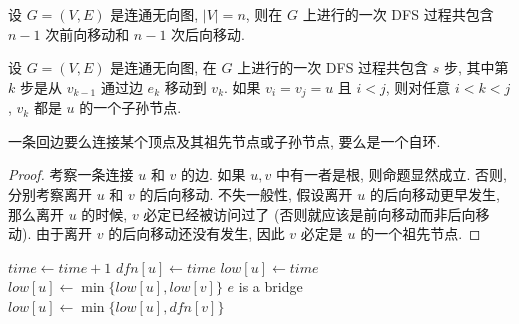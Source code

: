 \begin{corollary}
    设 $G=(V,E)$ 是连通无向图, $|V|=n$, 则在 $G$ 上进行的一次 DFS 过程共包含 $n-1$ 次前向移动和 $n-1$ 次后向移动.
\end{corollary}

\begin{corollary}
    设 $G=(V,E)$ 是连通无向图, 在 $G$ 上进行的一次 DFS 过程共包含 $s$ 步, 其中第 $k$ 步是从 $v_{k-1}$ 通过边 $e_k$ 移动到 $v_k$. 如果 $v_i=v_j=u$ 且 $i<j$, 则对任意 $i<k<j$, $v_k$ 都是 $u$ 的一个子孙节点.
\end{corollary}

\begin{theorem}
    一条回边要么连接某个顶点及其祖先节点或子孙节点, 要么是一个自环. 
\end{theorem}

\begin{proof}
    考察一条连接 $u$ 和 $v$ 的边. 如果 $u,v$ 中有一者是根, 则命题显然成立. 否则, 分别考察离开 $u$ 和 $v$ 的后向移动. 不失一般性, 假设离开 $u$ 的后向移动更早发生, 那么离开 $u$ 的时候, $v$ 必定已经被访问过了 (否则就应该是前向移动而非后向移动). 由于离开 $v$ 的后向移动还没有发生, 因此 $v$ 必定是 $u$ 的一个祖先节点.
\end{proof}

\begin{algo}
    \mbox{}

    \begin{algorithmic}
            \State $time\gets time+1$
            \State $dfn[u]\gets time$
            \State $low[u]\gets time$
                    \State {}
                    \State $low[u]\gets \min\{low[u], low[v]\}$
                        \State $e$ is a bridge
                    \EndIf
                \Else
                    \State $low[u]\gets \min\{low[u], dfn[v]\}$
                \EndIf
            \EndFor
        \EndProcedure
    \end{algorithmic}
\end{algo}